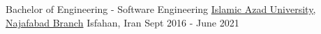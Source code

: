 
\begin{cventries}

  \cventry
    {Bachelor of Engineering - Software Engineering} %
    {\href{https://iaun.iau.ir/}{Islamic Azad University, Najafabad Branch}} %
    {Isfahan, Iran} %
    {Sept 2016 - June 2021} %
    {
      \begin{cvitems} %
      \end{cvitems}
    }

\end{cventries}
